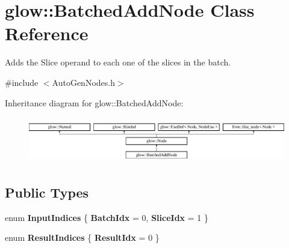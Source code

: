 \hypertarget{classglow_1_1_batched_add_node}{}\section{glow\+:\+:Batched\+Add\+Node Class Reference}
\label{classglow_1_1_batched_add_node}


Adds the \textquotesingle{}Slice\textquotesingle{} operand to each one of the slices in the batch.  




{\ttfamily \#include $<$Auto\+Gen\+Nodes.\+h$>$}

Inheritance diagram for glow\+:\+:Batched\+Add\+Node\+:\begin{figure}[H]
\begin{center}
\leavevmode
\includegraphics[height=2.028986cm]{classglow_1_1_batched_add_node}
\end{center}
\end{figure}
\subsection*{Public Types}
\begin{DoxyCompactItemize}
\item 
\mbox{\label{classglow_1_1_batched_add_node_a3223ce52d444b496f532d40c75daf0fd}} 
enum {\bfseries Input\+Indices} \{ {\bfseries Batch\+Idx} = 0, 
{\bfseries Slice\+Idx} = 1
 \}
\item 
\mbox{\label{classglow_1_1_batched_add_node_ab36fcd6401617444404fac4a6f4e2e62}} 
enum {\bfseries Result\+Indices} \{ {\bfseries Result\+Idx} = 0
 \}
\end{DoxyCompactItemize}
